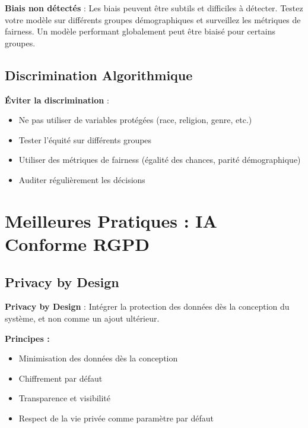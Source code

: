 \documentclass[11pt,a4paper]{article}
\begin{document}
\begin{dangerbox}
\textbf{Biais non détectés} : Les biais peuvent être subtils et difficiles à détecter. Testez votre modèle sur différents groupes démographiques et surveillez les métriques de fairness. Un modèle performant globalement peut être biaisé pour certains groupes.
\end{dangerbox}

\subsection{Discrimination Algorithmique}

\begin{importantbox}
\textbf{Éviter la discrimination} :
\begin{itemize}
    \item Ne pas utiliser de variables protégées (race, religion, genre, etc.)
    \item Tester l'équité sur différents groupes
    \item Utiliser des métriques de fairness (égalité des chances, parité démographique)
    \item Auditer régulièrement les décisions
\end{itemize}
\end{importantbox}

\section{Meilleures Pratiques : IA Conforme RGPD}

\subsection{Privacy by Design}

\begin{definitionbox}
\textbf{Privacy by Design} : Intégrer la protection des données dès la conception du système, et non comme un ajout ultérieur.
\end{definitionbox}

\textbf{Principes :}
\begin{itemize}
    \item Minimisation des données dès la conception
    \item Chiffrement par défaut
    \item Transparence et visibilité
    \item Respect de la vie privée comme paramètre par défaut
\end{itemize}
\end{document}
